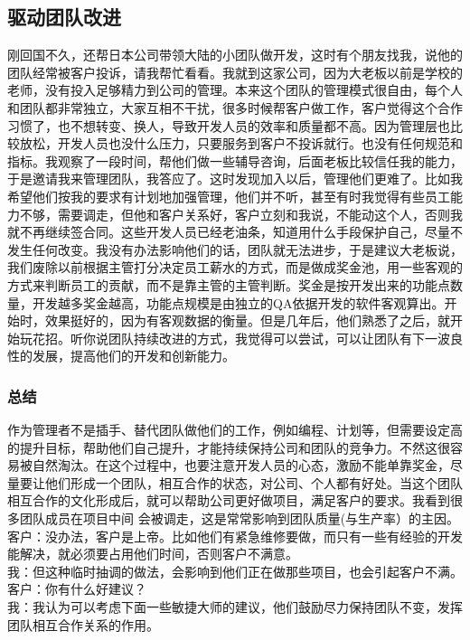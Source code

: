\hypertarget{ux9a71ux52a8ux56e2ux961fux6539ux8fdb}{%
\subsection{驱动团队改进}\label{ux9a71ux52a8ux56e2ux961fux6539ux8fdb}}

刚回国不久，还帮日本公司带领大陆的小团队做开发，这时有个朋友找我，说他的团队经常被客户投诉，请我帮忙看看。我就到这家公司，因为大老板以前是学校的老师，没有投入足够精力到公司的管理。本来这个团队的管理模式很自由，每个人和团队都非常独立，大家互相不干扰，很多时候帮客户做工作，客户觉得这个合作习惯了，也不想转变、换人，导致开发人员的效率和质量都不高。因为管理层也比较放松，开发人员也没什么压力，只要服务到客户不投诉就行。也没有任何规范和指标。我观察了一段时间，帮他们做一些辅导咨询，后面老板比较信任我的能力，于是邀请我来管理团队，我答应了。这时发现加入以后，管理他们更难了。比如我希望他们按我的要求有计划地加强管理，他们并不听，甚至有时我觉得有些员工能力不够，需要调走，但他和客户关系好，客户立刻和我说，不能动这个人，否则我就不再继续签合同。这些开发人员已经老油条，知道用什么手段保护自己，尽量不发生任何改变。我没有办法影响他们的话，团队就无法进步，于是建议大老板说，我们废除以前根据主管打分决定员工薪水的方式，而是做成奖金池，用一些客观的方式来判断员工的贡献，而不是靠主管的主管判断。奖金是按开发出来的功能点数量，开发越多奖金越高，功能点规模是由独立的QA依据开发的软件客观算出。开始时，效果挺好的，因为有客观数据的衡量。但是几年后，他们熟悉了之后，就开始玩花招。听你说团队持续改进的方式，我觉得可以尝试，可以让团队有下一波良性的发展，提高他们的开发和创新能力。

\hypertarget{ux603bux7ed3}{%
\subsubsection{总结}\label{ux603bux7ed3}}

作为管理者不是插手、替代团队做他们的工作，例如编程、计划等，但需要设定高的提升目标，帮助他们自己提升，才能持续保持公司和团队的竞争力。不然这很容易被自然淘汰。在这个过程中，也要注意开发人员的心态，激励不能单靠奖金，尽量要让他们形成一个团队，相互合作的状态，对公司、个人都有好处。当这个团队相互合作的文化形成后，就可以帮助公司更好做项目，满足客户的要求。我看到很多团队成员在项目中间
会被调走，这是常常影响到团队质量(与生产率）的主因。\\
客户：没办法，客户是上帝。比如他们有紧急维修要做，而只有一些有经验的开发能解决，就必须要占用他们时间，否则客户不满意。\\
我：但这种临时抽调的做法，会影响到他们正在做那些项目，也会引起客户不满。\\
客户：你有什么好建议？\\
我：我认为可以考虑下面一些敏捷大师的建议，他们鼓励尽力保持团队不变，发挥团队相互合作关系的作用。\\

